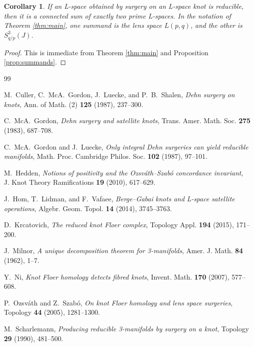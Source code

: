 \documentclass[11pt]{article}
\newtheorem{corollary}[theorem]{Corollary}
\theoremstyle{definition}
\theoremstyle{remark}
\begin{document}
\begin{corollary}
If an L-space obtained by surgery on an L-space knot is reducible,
then it is a connected sum of exactly two prime L-spaces.  In the
notation of Theorem \ref{thm:main}, one summand is the lens space
\(L(p,q)\), and the other is \(S^3_{q/p}(J)\).
\end{corollary}

\begin{proof}
This is immediate from Theorem \ref{thm:main} and Proposition
\ref{prop:summands}.
\end{proof}

\begin{thebibliography}{99}

M.~Culler, C.~McA.~Gordon, J.~Luecke, and P.~B.~Shalen,
\emph{Dehn surgery on knots},
Ann. of Math. (2) \textbf{125} (1987), 237--300.

C.~McA.~Gordon,
\emph{Dehn surgery and satellite knots},
Trans. Amer. Math. Soc. \textbf{275} (1983), 687--708.

C.~McA.~Gordon and J.~Luecke,
\emph{Only integral Dehn surgeries can yield reducible manifolds},
Math. Proc. Cambridge Philos. Soc. \textbf{102} (1987), 97--101.

M.~Hedden,
\emph{Notions of positivity and the Ozsv\'ath--Szab\'o concordance
invariant},
J. Knot Theory Ramifications \textbf{19} (2010), 617--629.

J.~Hom, T.~Lidman, and F.~Vafaee,
\emph{Berge--Gabai knots and L-space satellite operations},
Algebr. Geom. Topol. \textbf{14} (2014), 3745--3763.

D.~Krcatovich,
\emph{The reduced knot Floer complex},
Topology Appl. \textbf{194} (2015), 171--200.

J.~Milnor,
\emph{A unique decomposition theorem for 3-manifolds},
Amer. J. Math. \textbf{84} (1962), 1--7.

Y.~Ni,
\emph{Knot Floer homology detects fibred knots},
Invent. Math. \textbf{170} (2007), 577--608.

P.~Ozsv\'ath and Z.~Szab\'o,
\emph{On knot Floer homology and lens space surgeries},
Topology \textbf{44} (2005), 1281--1300.

M.~Scharlemann,
\emph{Producing reducible 3-manifolds by surgery on a knot},
Topology \textbf{29} (1990), 481--500.

\end{thebibliography}
\end{document}

